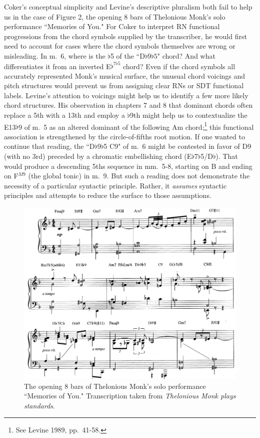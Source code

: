Coker's conceptual simplicity and Levine's descriptive pluralism both fail to help us in the case of Figure 2, the opening 8 bars of Thelonious Monk's solo performance ``Memories of You."  For Coker to interpret RN functional progressions from the chord symbols supplied by the transcriber, he would first need to account for cases where the chord symbols themselves are wrong or misleading.  In m.\ 6, where is the $\flat$5 of the ``D$\flat 9\flat 5$" chord?  And what differentiates it from an inverted E$\flat^{7\flat 5}$ chord?  Even if the chord symbols all accurately represented Monk's musical surface, the unusual chord voicings and pitch structures would prevent us from assigning clear RNs or SDT functional labels.  Levine's attention to voicings might help us to identify a few more likely chord structures.  His observation in chapters 7 and 8 that dominant chords often replace a 5th with a 13th and employ a $\flat$9th might help us to contextualize the E13$\flat$9 of m.\ 5 as an altered dominant of the following Am chord;\footnote{See Levine 1989, pp.\ 41-58.} this functional association is strengthened by the circle-of-fifths root motion.  If one wanted to continue that reading, the ``D$\flat$9$\flat$5 C9" of m.\ 6 might be contested in favor of D9 (with no 3rd) preceded by a chromatic embellishing chord (E$\flat$7$\flat$5/D$\flat$). That would produce a descending 5ths sequence in mm.\ 5-8, starting on B and ending on F$^{M9}$ (the global tonic) in m.\ 9.   But such a reading does not demonstrate the necessity of a particular syntactic principle.  Rather, it \emph{assumes} syntactic principles and attempts to reduce the surface to those assumptions.
\begin{figure}
	\centering
	\caption{The opening 8 bars of Thelonious Monk's solo performance ``Memories of You."  Transcription taken from \emph{Thelonious Monk plays standards}.}
	\includegraphics[width=6.5in]{diss_prospectus_monk.png}
\end{figure}

